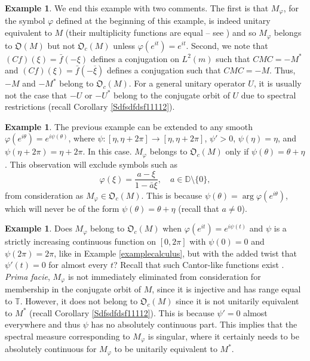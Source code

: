 \documentclass{dis}
\theoremstyle{plain}
\theoremstyle{definition}
\newtheorem{Example}[equation]{Example}
\def\D{\mathbb{D}}
\def\T{\mathbb{T}}
\renewcommand{\phi}{\varphi}
\newcommand{\0}{{\color{lightgray}0}}
\begin{document}
\begin{Example}
We end this example with two comments.  The first is that $M_{\phi}$, for the symbol $\phi$ defined at the beginning of this example, is indeed unitary equivalent to $M$ (their multiplicity functions are equal -- see \cite{MR526530, MR320797}) and so $M_{\phi}$ belongs to $\mathfrak{O}(M)$ but not $\mathfrak{O}_c(M)$ unless $\phi(e^{i t}) = e^{i t}$. Second, we note that $(C f)(\xi) = \bar{f}(-\xi)$ defines  a conjugation on $L^2(m)$ such that $C M C = -M^{*}$ and $(C f)(\xi) = \bar{f}(-\overline{\xi})$ defines a conjugation such that $C M C = -M$. Thus, $-M$ and $-M^{*}$ belong to $\mathfrak{O}_c(M)$. For a general unitary operator $U$, it is usually not the case that $-U$ or $-U^{*}$ belong to the conjugate orbit of $U$ due to spectral restrictions (recall Corollary \ref{Sdfsdfdsf11112}). 
\end{Example}

\begin{Example}
The previous example can be extended to any smooth $\phi(e^{i \theta}) = e^{i \psi(\theta)}$, where $\psi: [\eta, \eta + 2 \pi] \to [\eta, \eta + 2 \pi]$, $\psi' > 0$, $\psi(\eta) = \eta$, and $\psi(\eta + 2 \pi) = \eta + 2 \pi$. In this case. $M_{\phi}$ belongs to $\mathfrak{O}_c(M)$ only if $\psi(\theta) = \theta + \eta$. This observation will exclude symbols such as 
$$\phi(\xi) = \frac{a - \xi}{1 - \bar a \xi}, \quad a \in \D \setminus \{0\},$$
from consideration as $M_{\phi} \in \mathfrak{O}_c(M)$. This is because 
$\psi(\theta) = \arg \phi(e^{i \theta})$, which will never be of the form $\psi(\theta) = \theta + \eta$ (recall that $a \not = 0$). 
\end{Example}

\begin{Example}
Does  $M_{\phi}$ belong to $\mathfrak{O}_c(M)$ when  $\phi(e^{i t}) = e^{i \psi(t)}$ and $\psi$ is a strictly increasing continuous function on $[0, 2 \pi]$ with  $\psi(0) = 0$ and $\psi(2 \pi) = 2 \pi$, like in Example \ref{examplecalculus}, but with the added twist that  $\psi'(t) = 0$ for almost every $t$? Recall that such Cantor-like functions exist \cite{MR197639}.  {\em Prima facie}, $M_{\phi}$ is not immediately eliminated from consideration for membership in the conjugate orbit of $M$, since it is injective and has range equal to  $\T$. However, it does not belong to $\mathfrak{O}_c(M)$ since it is not unitarily equivalent to $M^{*}$ (recall Corollary \ref{Sdfsdfdsf11112}). This is because  $\psi' = 0$ almost everywhere and thus $\psi$  has no absolutely continuous part. This implies that the spectral measure corresponding to $M_{\phi}$ is singular, where it certainly needs to be absolutely continuous for $M_{\phi}$ to be unitarily equivalent to $M^{*}$. 
\end{Example}
\end{document}
